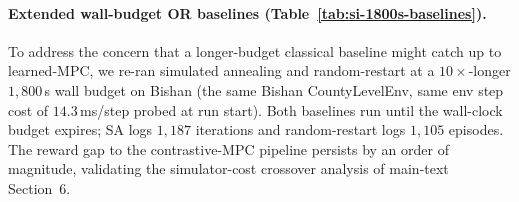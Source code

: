 \documentclass[11pt]{article}
\begin{document}
\paragraph{Extended wall-budget OR baselines (Table~\ref{tab:si-1800s-baselines}).} To address the concern that a longer-budget classical baseline might catch up to learned-MPC, we re-ran simulated annealing and random-restart at a $10\times$-longer $1{,}800$\,s wall budget on Bishan (the same Bishan CountyLevelEnv, same env step cost of $14.3$\,ms/step probed at run start). Both baselines run until the wall-clock budget expires; SA logs $1{,}187$ iterations and random-restart logs $1{,}105$ episodes. The reward gap to the contrastive-MPC pipeline persists by an order of magnitude, validating the simulator-cost crossover analysis of main-text Section~6.

\begin{table}[htbp]
\centering
\small
\caption{Bishan reward versus wall-clock budget across simulated annealing, random-restart, and contrastive MPC. Both OR baselines plateau at an order of magnitude below the contrastive-MPC comparison value under the tested budgets; the additional $1{,}620$\,s of SA wall time buys only $+0.50$ reward units. Source: \texttt{runs/bishan/farmland\_baselines\_1800s.json} and \texttt{tests/farmland\_baselines.py}.}
\label{tab:si-1800s-baselines}
\end{table}
\end{document}
